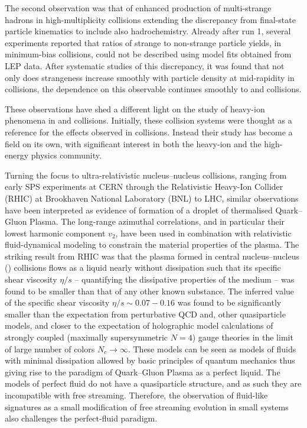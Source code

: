\documentclass[../report.tex]{subfiles}
\begin{document}
The second observation was that of enhanced production of multi-strange hadrons in high-multiplicity \pp collisions extending the discrepancy from final-state particle kinematics to include also hadrochemistry. Already after run 1, several experiments reported that ratios of strange to non-strange particle yields, in minimum-bias collisions, could not be described using model fits obtained from LEP data. After systematic studies of this discrepancy, it was found that not only does strangeness increase smoothly with particle density at mid-rapidity in \pp collisions, the dependence on this observable continues smoothly to \pPb and \PbPb collisions.

These observations have shed a different light on the study of heavy-ion phenomena in \pp and \pPb collisions. Initially, these collision systems were thought as a reference for the effects observed in \PbPb collisions. Instead their study has become a field on its own, with significant interest in both the heavy-ion and the high-energy physics community.


Turning the focus to ultra-relativistic nucleus--nucleus collisions, ranging from early SPS experiments at CERN through the Relativistic Heavy-Ion Collider (RHIC) at Brookhaven National Laboratory (BNL) to LHC, similar observations have been interpreted as evidence of formation of a droplet of thermalised Quark--Gluon Plasma. The long-range azimuthal correlations, and in particular their lowest harmonic component $v_2$, have been used in combination with relativistic fluid-dynamical modeling to constrain the material properties of the plasma.  The striking result from RHIC was that the plasma formed in central nucleus--nucleus (\AOnA) collisions flows as a liquid nearly without dissipation such that its specific shear viscosity $\eta/s$ -- quantifying the dissipative properties of the medium -- was found to be smaller than that of any other known substance. The inferred value of the specific shear viscosity $\eta/s\sim 0.07-0.16$ was found to be significantly smaller than the expectation from perturbative QCD and, other quasiparticle models, and closer to the expectation of holographic model calculations of strongly coupled (maximally supersymmetric $N=4$) gauge theories in the limit of large number of colors $N_c \rightarrow \infty$. These models can be seen as models of fluids with minimal dissipation allowed by basic principles of quantum mechanics thus giving rise to the paradigm of Quark--Gluon Plasma as a perfect liquid. The models of perfect fluid do not have a quasiparticle structure, and as such they are incompatible with free streaming. Therefore, the observation of fluid-like signatures as a small modification of free streaming evolution in small systems also challenges the perfect-fluid paradigm.
\end{document}

